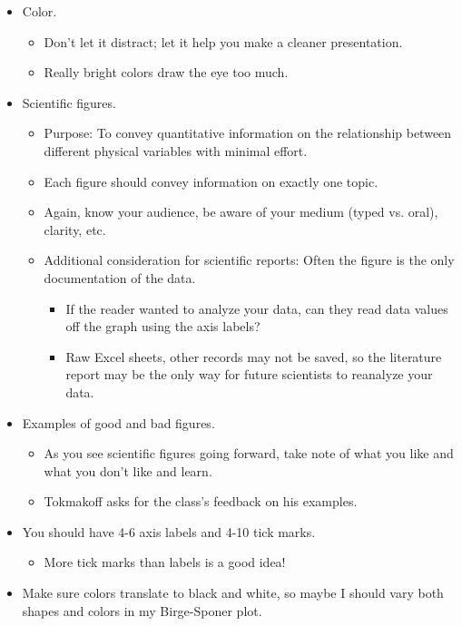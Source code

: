 \documentclass[../notes.tex]{subfiles}
\begin{document}
\begin{itemize}
    \item Color.
    \begin{itemize}
        \item Don't let it distract; let it help you make a cleaner presentation.
        \item Really bright colors draw the eye too much.
    \end{itemize}
    \item Scientific figures.
    \begin{itemize}
        \item Purpose: To convey quantitative information on the relationship between different physical variables with minimal effort.
        \item Each figure should convey information on exactly one topic.
        \item Again, know your audience, be aware of your medium (typed vs. oral), clarity, etc.
        \item Additional consideration for scientific reports: Often the figure is the only documentation of the data.
        \begin{itemize}
            \item If the reader wanted to analyze your data, can they read data values off the graph using the axis labels?
            \item Raw Excel sheets, other records may not be saved, so the literature report may be the only way for future scientists to reanalyze your data.
        \end{itemize}
    \end{itemize}
    \item Examples of good and bad figures.
    \begin{itemize}
        \item As you see scientific figures going forward, take note of what you like and what you don't like and learn.
        \item Tokmakoff asks for the class's feedback on his examples.
    \end{itemize}
    \item You should have 4-6 axis labels and 4-10 tick marks.
    \begin{itemize}
        \item More tick marks than labels is a good idea!
    \end{itemize}
    \item Make sure colors translate to black and white, so maybe I should vary both shapes and colors in my Birge-Sponer plot.

\end{itemize}
\end{document}
